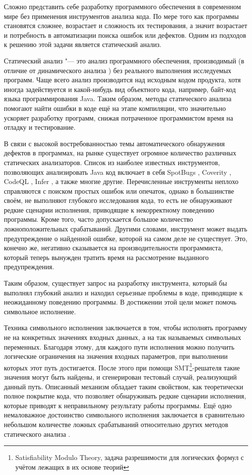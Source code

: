 
Сложно представить себе разработку программного обеспечения в современном мире без применения инструментов анализа кода. По мере того как программы становятся сложнее, возрастает и сложность их тестирования, а значит возрастает и потребность в автоматизации поиска ошибок или дефектов. Одним из подходов к решению этой задачи является статический анализ.

Статический анализ "--- это анализ программного обеспечения, производимый (в отличие от динамического анализа \cite{dynca}) без реального выполнения исследуемых программ. Чаще всего анализ производится над исходным кодом продукта, хотя иногда задействуется и какой-нибудь вид объектного кода, например, байт-код языка программирования Java. Таким образом, методы статического анализа помогают найти ошибки в коде ещё на этапе компиляции, что значительно ускоряет разработку программ, снижая потраченное программистом время на отладку и тестирование.

В связи с высокой востребованностью темы автоматического обнаружения дефектов в программах, на рынке существует огромное количество различных статических анализаторов. Список из наиболее известных инструментов, позволяющих анализировать Java код включает в себя SpotBugs \cite{spotbugs}, Coverity \cite{coverity}, CodeQL \cite{codeql}, Infer \cite{fbinfer}, а также многие другие. Перечисленные инструменты неплохо справляются с поиском простых ошибок или опечаток, однако в большинстве своём, не выполняют глубокого исследования кода, то есть не обнаруживают редкие сценарии исполнения, приводящие к некорректному поведению программы. Кроме того, часто допускается большое количество ложноположительных срабатываний. Другими словами, инструмент может выдать предупреждение о найденной ошибке, которой на самом деле не существует. Это, конечно же, негативно сказывается на производительности программиста, который теперь вынужден тратить время на рассмотрение выданного предупреждения.

Таким образом, существует запрос на разработку инструмента, который бы выполнял глубокий анализ и находил серьезные проблемы в коде, приводящие к неожиданному поведению программы. В достижении этой цели может помочь символьное исполнение. 

Техника символьного исполнения заключается в том, чтобы исполнять программу не на конкретных значениях входных данных, а на так называемых символьных переменных. Благодаря этому, для каждого пути исполнения можно получить логические ограничения на значения входных параметров, при выполнении которых этот путь достигается. После этого при помощи SMT\footnote{Satisfiability Modulo Theory, задача разрешимости для логических формул с учётом лежащих в их основе теорий}-решателя такие значения могут быть найдены, и сгенерирован тестовый случай, реализующий данный путь. Описанный механизм обладает таким свойством, как теоретически полное покрытие кода, что позволяет обнаруживать редкие сценарии исполнения, которые приводят к неправильному результату работы программы. Ещё одно немаловажное достоинство символьного исполнения заключается в сравнительно небольшом количестве ложных срабатываний относительно других методов статического анализа \cite{sym-compare}.

